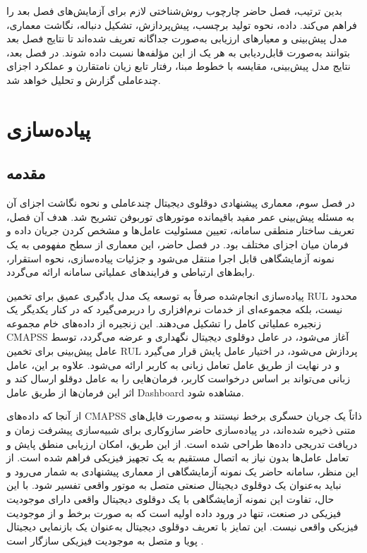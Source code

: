 بدین ترتیب، فصل حاضر چارچوب روش‌شناختی لازم برای آزمایش‌های فصل
بعد را فراهم می‌کند. داده، نحوه تولید برچسب، پیش‌پردازش، تشکیل
دنباله، نگاشت معماری، مدل پیش‌بینی و معیارهای ارزیابی به‌صورت
جداگانه تعریف شده‌اند تا نتایج فصل بعد بتوانند به‌صورت
قابل‌ردیابی به هر یک از این مؤلفه‌ها نسبت داده شوند. در فصل
بعد، نتایج مدل پیش‌بینی، مقایسه با خطوط مبنا، رفتار تابع زیان
نامتقارن و عملکرد اجزای چندعاملی گزارش و تحلیل خواهد شد.



\chapter{پیاده‌سازی}\label{chap:impl}

\section{مقدمه}

در فصل سوم، معماری پیشنهادی دوقلوی دیجیتال چندعاملی و نحوه نگاشت اجزای آن به مسئله پیش‌بینی عمر مفید باقیمانده موتورهای توربوفن تشریح شد. هدف آن فصل، تعریف ساختار منطقی سامانه، تعیین مسئولیت عامل‌ها و مشخص کردن جریان داده و فرمان میان اجزای مختلف بود. در فصل حاضر، این معماری از سطح مفهومی به یک نمونه آزمایشگاهی قابل اجرا منتقل می‌شود و جزئیات پیاده‌سازی، نحوه استقرار، رابط‌های ارتباطی و فرایندهای عملیاتی سامانه ارائه می‌گردد.

پیاده‌سازی انجام‌شده صرفاً به توسعه یک مدل یادگیری عمیق برای تخمین \gls{RUL} محدود نیست، بلکه مجموعه‌ای از خدمات نرم‌افزاری را دربرمی‌گیرد که در کنار یکدیگر یک زنجیره عملیاتی کامل را تشکیل می‌دهند. این زنجیره از داده‌های خام مجموعه \gls{CMAPSS} آغاز می‌شود، در عامل دوقلوی دیجیتال نگهداری و عرضه می‌گردد، توسط عامل پیش‌بینی برای تخمین \gls{RUL} پردازش می‌شود، در اختیار عامل پایش قرار می‌گیرد و در نهایت از طریق عامل تعامل زبانی به کاربر ارائه می‌شود. علاوه بر این، عامل زبانی می‌تواند بر اساس درخواست کاربر، فرمان‌هایی را به عامل دوقلو ارسال کند و اثر این فرمان‌ها از طریق عامل \gls{Dashboard} مشاهده شود.

از آنجا که داده‌های \gls{CMAPSS} ذاتاً یک جریان حسگری برخط نیستند و به‌صورت فایل‌های متنی ذخیره شده‌اند، در پیاده‌سازی حاضر سازوکاری برای شبیه‌سازی پیشرفت زمان و دریافت تدریجی داده‌ها طراحی شده است. از این طریق، امکان ارزیابی منطق پایش و تعامل عامل‌ها بدون نیاز به اتصال مستقیم به یک تجهیز فیزیکی فراهم شده است. از این منظر، سامانه حاضر یک نمونه آزمایشگاهی از معماری پیشنهادی به شمار می‌رود و نباید به‌عنوان یک دوقلوی دیجیتال صنعتی متصل به موتور واقعی تفسیر شود. با این حال،‌ تفاوت این نمونه آزمایشگاهی با یک دوقلوی دیجیتال واقعی دارای موجودیت فیزیکی در صنعت، تنها در ورود داده اولیه است که به صورت برخط و از موجودیت فیزیکی واقعی نیست. این تمایز با تعریف دوقلوی دیجیتال به‌عنوان یک بازنمایی دیجیتال پویا و متصل به موجودیت فیزیکی سازگار است \cite{tao2018digital,qi2021enabling}.

